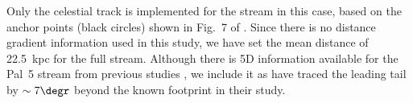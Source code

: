 Only the celestial track is implemented for the stream in this case, based on the anchor points (black circles) shown in Fig.~7 of \citet{Starkman2020}. Since there is no distance gradient information used in this study, we have set the mean distance of 22.5~kpc for the full stream. Although there is 5D information available for the Pal~5 stream from previous studies \citep{PriceWhelan2019_pal5,Ibata2021}, we include it as \citet{Starkman2020} have traced the leading tail by $\sim7\degr$ beyond the known footprint in their study.
